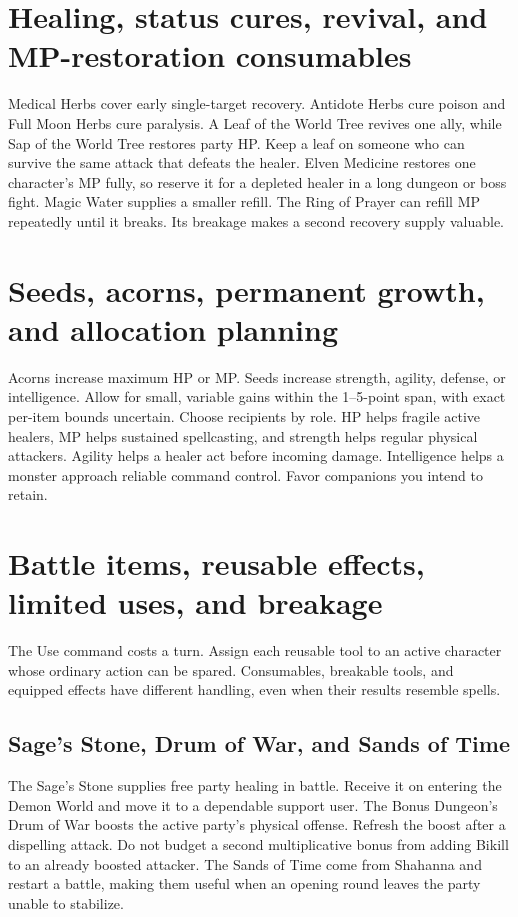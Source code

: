 \section{Healing, status cures, revival, and MP-restoration consumables}
Medical Herbs cover early single-target recovery. Antidote Herbs cure poison and Full Moon Herbs cure paralysis. A Leaf of the World Tree revives one ally, while Sap of the World Tree restores party HP. Keep a leaf on someone who can survive the same attack that defeats the healer. Elven Medicine restores one character's MP fully, so reserve it for a depleted healer in a long dungeon or boss fight. Magic Water supplies a smaller refill. The Ring of Prayer can refill MP repeatedly until it breaks. Its breakage makes a second recovery supply valuable.

\section{Seeds, acorns, permanent growth, and allocation planning}
Acorns increase maximum HP or MP. Seeds increase strength, agility, defense, or intelligence. Allow for small, variable gains within the 1--5-point span, with exact per-item bounds uncertain. Choose recipients by role. HP helps fragile active healers, MP helps sustained spellcasting, and strength helps regular physical attackers. Agility helps a healer act before incoming damage. Intelligence helps a monster approach reliable command control. Favor companions you intend to retain.

\section{Battle items, reusable effects, limited uses, and breakage}
The Use command costs a turn. Assign each reusable tool to an active character whose ordinary action can be spared. Consumables, breakable tools, and equipped effects have different handling, even when their results resemble spells.

\subsection{Sage's Stone, Drum of War, and Sands of Time}
The Sage's Stone supplies free party healing in battle. Receive it on entering the Demon World and move it to a dependable support user. The Bonus Dungeon's Drum of War boosts the active party's physical offense. Refresh the boost after a dispelling attack. Do not budget a second multiplicative bonus from adding Bikill to an already boosted attacker. The Sands of Time come from Shahanna and restart a battle, making them useful when an opening round leaves the party unable to stabilize.

